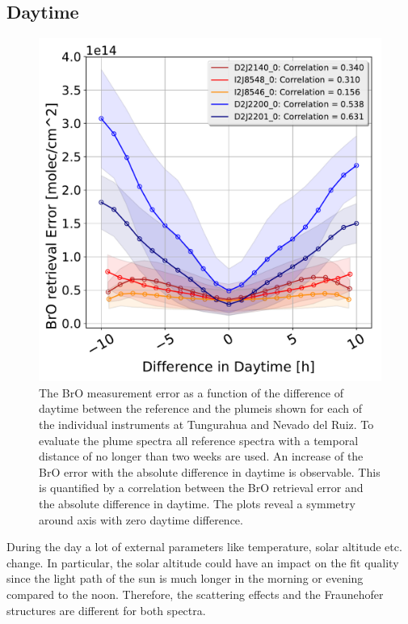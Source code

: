 \subsection{ Daytime \label{chap:daytime}}
	\begin{figure}
	\centering
	\includegraphics[width=0.7\linewidth]{Bilder/DiffDaytimeallInstruments}
	\caption{The BrO measurement error as a function of the difference of daytime between the reference and the plumeis shown for each of the individual instruments at Tungurahua and Nevado del Ruiz. To evaluate the plume spectra all reference spectra with a temporal distance of no longer than two weeks are used. An increase of the BrO error with the absolute difference in daytime is observable. This is quantified by a correlation between the BrO retrieval error and the absolute difference in daytime. The plots reveal a symmetry around axis with zero daytime difference. }
	\label{fig:diffdaytime}
\end{figure}
During the day a lot of external parameters like temperature, solar altitude etc. change. In particular, the solar altitude could have an impact on the fit quality since the light path of the sun is much longer in the morning or evening compared to the noon. Therefore, the scattering effects and the Fraunehofer structures are different for both spectra.\\

